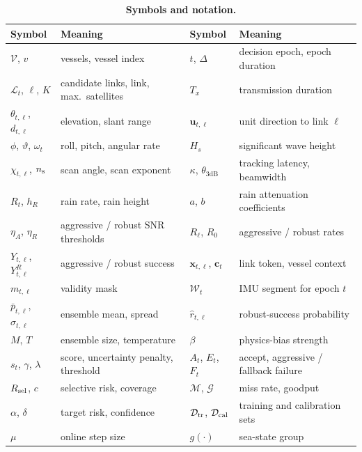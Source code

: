 \begin{table}[t]
\centering\small
\caption{\textbf{Symbols and notation.}}
\label{tab:symbols}
\begin{tabular}{@{}ll@{\hspace{1.2em}}ll@{}}
\toprule
Symbol & Meaning & Symbol & Meaning\\\midrule
$\mathcal V$, $v$ & vessels, vessel index & $t$, $\Delta$ & decision epoch, epoch duration\\
$\mathcal L_t$, $\ell$, $K$ & candidate links, link, max.\ satellites & $T_x$ & transmission duration\\
$\theta_{t,\ell}$, $d_{t,\ell}$ & elevation, slant range & $\bm u_{t,\ell}$ & unit direction to link $\ell$\\
$\phi$, $\vartheta$, $\omega_t$ & roll, pitch, angular rate & $H_s$ & significant wave height\\
$\chi_{t,\ell}$, $n_{\rm s}$ & scan angle, scan exponent & $\kappa$, $\theta_{3\mathrm{dB}}$ & tracking latency, beamwidth\\
$R_t$, $h_R$ & rain rate, rain height & $a$, $b$ & rain attenuation coefficients\\
$\eta_A$, $\eta_R$ & aggressive / robust SNR thresholds & $R_\ell$, $R_0$ & aggressive / robust rates\\
$Y_{t,\ell}$, $Y^R_{t,\ell}$ & aggressive / robust success & $\bm x_{t,\ell}$, $\bm c_t$ & link token, vessel context\\
$m_{t,\ell}$ & validity mask & $\mathcal W_t$ & IMU segment for epoch $t$\\
$\bar p_{t,\ell}$, $\sigma_{t,\ell}$ & ensemble mean, spread & $\hat r_{t,\ell}$ & robust-success probability\\
$M$, $T$ & ensemble size, temperature & $\beta$ & physics-bias strength\\
$s_t$, $\gamma$, $\lambda$ & score, uncertainty penalty, threshold & $A_t$, $E_t$, $F_t$ & accept, aggressive / fallback failure\\
$R_{\rm sel}$, $c$ & selective risk, coverage & $\mathcal M$, $\mathcal G$ & miss rate, goodput\\
$\alpha$, $\delta$ & target risk, confidence & $\mathcal D_{\rm tr}$, $\mathcal D_{\rm cal}$ & training and calibration sets\\
$\mu$ & online step size & $g(\cdot)$ & sea-state group\\
\bottomrule
\end{tabular}
\end{table}

